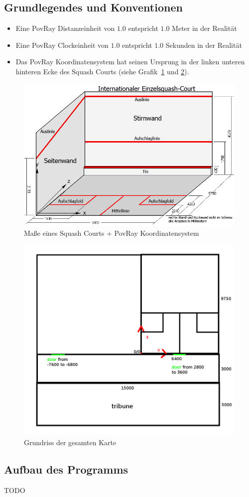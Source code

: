 \subsection{Grundlegendes und Konventionen}
\begin{itemize}
	\item Eine PovRay Distanzeinheit von $1.0$ entspricht $1.0$ Meter in der Realität
	\item Eine PovRay Clockeinheit von $1.0$ entspricht $1.0$ Sekunden in der Realität
	\item Das PovRay Koordinatensystem hat seinen Ursprung in der linken unteren hinteren Ecke des Squash Courts (siehe Grafik~\ref{fig:squashcourt} und \ref{fig:halloutline}).
\end{itemize}
%
\begin{figure}%
	\centering
	\includegraphics[width=.9\linewidth]{images/Squash_Court.png}
	\caption{Maße eines Squash Courts + PovRay Koordinatensystem}\label{fig:squashcourt}
\end{figure}
\begin{figure}%
	\centering
	\includegraphics[width=.7\linewidth]{images/hall_outline.png}
	\caption{Grundriss der gesamten Karte}\label{fig:halloutline}
\end{figure}
\subsection{Aufbau des Programms}
TODO


